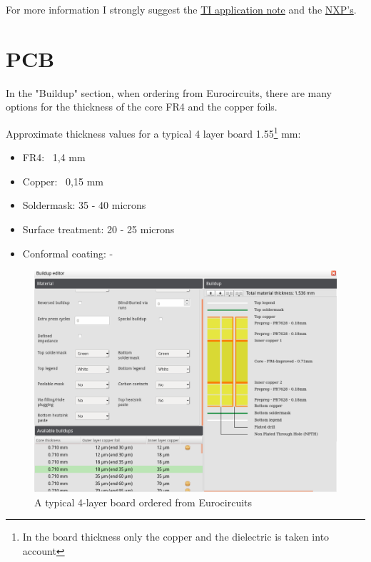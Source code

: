 \documentclass[final]{cubedoc}
\begin{document}

For more information I strongly suggest the \href{https://www.ti.com/lit/an/spra953c/spra953c.pdf}{TI application note} and the \href{https://www.nxp.com/docs/en/white-paper/BasicThermalWP.pdf}{NXP's}.

\pagebreak
\section{PCB}

In the "Buildup" section, when ordering from Eurocircuits, there are many options for the thickness of the core FR4 and the copper foils.

Approximate thickness values for a typical 4 layer board 1.55\footnote{In the board thickness only the copper and the dielectric is taken into account} mm:
\begin{itemize}
    \item FR4: ~1,4 mm
    \item Copper: ~0,15 mm
    \item Soldermask: 35 - 40 microns
    \item Surface treatment: 20 - 25 microns
    \item Conformal coating: -
\end{itemize}


\begin{figure}[h!]
    \centering
    \includegraphics[keepaspectratio, height=0.4\textheight, width=\textwidth]{docs/stackup.png}
    \caption{A typical 4-layer board ordered from Eurocircuits}
    \label{fig:my_label}
\end{figure}{}
\end{document}
